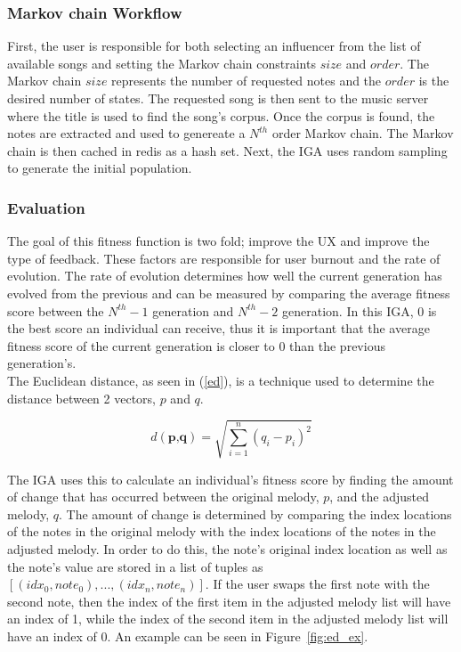 \documentclass[12pt]{article} %
\begin{document}
\subsubsection{Markov chain Workflow}
First, the user is responsible for both selecting an influencer from the list of available songs and setting the Markov chain constraints $size$ and $order$. The Markov chain $size$ represents the number of requested notes and the $order$ is the desired number of states. The requested song is then sent to the music server where the title is used to find the song's corpus. Once the corpus is found, the notes are extracted and used to genereate a $N^{th}$ order Markov chain. The Markov chain is then cached in redis as a hash set. Next, the IGA uses random sampling to generate the initial population.



\subsubsection{Evaluation}
The goal of this fitness function is two fold; improve the UX and improve the type of feedback. These factors are responsible for user burnout and the rate of evolution. The rate of evolution determines how well the current generation has evolved from the previous and can be measured by comparing the average fitness score between the $N^{th}-1$ generation and $N^{th}-2$ generation. In this IGA, 0 is the best score an individual can receive, thus it is important that the average fitness score of the current generation is closer to 0 than the previous generation's.
\\
The Euclidean distance, as seen in (\ref{ed}), is a technique used to determine the distance between 2 vectors, $p$ and $q$. 

\begin{equation}
	d(\textbf{p,q}) = \sqrt{\sum_{i=1}^n (q_i - p_i)^2} 
	\label{ed}
\end{equation}

The IGA uses this to calculate an individual's fitness score by finding the amount of change that has occurred between the original melody, $p$, and the adjusted melody, $q$. The amount of change is determined by comparing the index locations of the notes in the original melody with the index locations of the notes in the adjusted melody. In order to do this, the note's original index location as well as the note's value are stored in a list of tuples as $[(idx_{0},note_{0}), ... , (idx_{n}, note_{n})]$. If the user swaps the first note with the second note, then the index of the first item in the adjusted melody list will have an index of 1, while the index of the second item in the adjusted melody list will have an index of 0. An example can be seen in Figure~\ref{fig:ed_ex}.  \\
\end{document}
